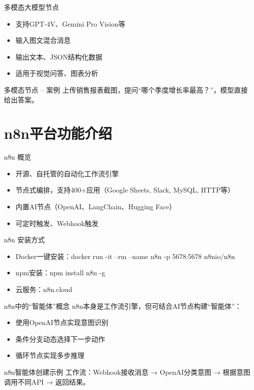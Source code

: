 \begin{frame}{多模态大模型节点}
\begin{itemize}
\item 支持GPT-4V、Gemini Pro Vision等
\item 输入图文混合消息
\item 输出文本、JSON结构化数据
\item 适用于视觉问答、图表分析
\end{itemize}
\end{frame}
\begin{frame}{多模态节点 – 案例}
上传销售报表截图，提问“哪个季度增长率最高？”，模型直接给出答案。
\end{frame}


\section{n8n平台功能介绍}

\begin{frame}{n8n 概览}
\begin{itemize}
\item 开源、自托管的自动化工作流引擎
\item 节点式编排，支持400+应用（Google Sheets, Slack, MySQL, HTTP等）
\item 内置AI节点（OpenAI、LangChain、Hugging Face）
\item 可定时触发、Webhook触发
\end{itemize}
\end{frame}

\begin{frame}{n8n 安装方式}
\begin{itemize}
\item Docker一键安装：docker run -it --rm --name n8n -p 5678:5678 n8nio/n8n
\item npm安装：npm install n8n -g
\item 云服务：n8n.cloud
\end{itemize}
\end{frame}

\begin{frame}{n8n中的“智能体”概念}
n8n本身是工作流引擎，但可结合AI节点构建“智能体”：
\begin{itemize}
\item 使用OpenAI节点实现意图识别
\item 条件分支动态选择下一步动作
\item 循环节点实现多步推理
\end{itemize}
\end{frame}
\begin{frame}{n8n智能体创建示例}
工作流：Webhook接收消息 → OpenAI分类意图 → 根据意图调用不同API → 返回结果。
\end{frame}

